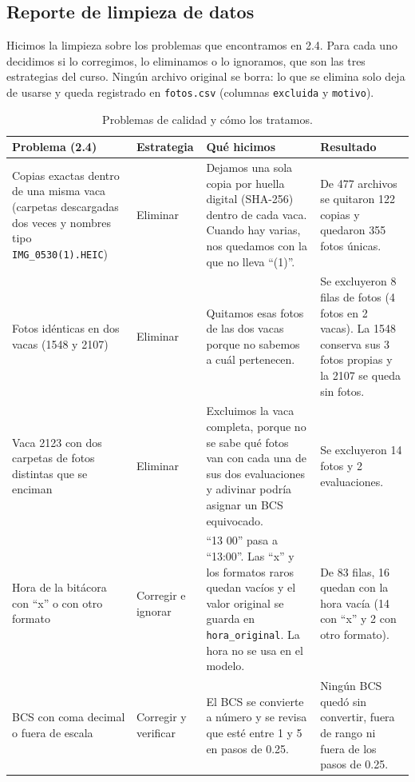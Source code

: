 \subsection{Reporte de limpieza de datos}

Hicimos la limpieza sobre los problemas que encontramos en 2.4. Para cada uno decidimos si lo corregimos, lo eliminamos o lo ignoramos, que son las tres estrategias del curso. Ningún archivo original se borra: lo que se elimina solo deja de usarse y queda registrado en \nolinkurl{fotos.csv} (columnas \texttt{excluida} y \texttt{motivo}).

\begin{table}[H]
  \centering
  \small
  \caption{Problemas de calidad y cómo los tratamos.}
  \label{tab:limpieza}
  \begin{tabularx}{\textwidth}{>{\raggedright\arraybackslash}p{}>{\raggedright\arraybackslash}p{}>{\raggedright\arraybackslash}X>{\raggedright\arraybackslash}p{}}
    \toprule
    Problema (2.4) & Estrategia & Qué hicimos & Resultado \\
    \midrule
    Copias exactas dentro de una misma vaca (carpetas descargadas dos veces y nombres tipo \nolinkurl{IMG_0530(1).HEIC}) & Eliminar & Dejamos una sola copia por huella digital (SHA-256) dentro de cada vaca. Cuando hay varias, nos quedamos con la que no lleva ``(1)''. & De 477 archivos se quitaron 122 copias y quedaron 355 fotos únicas. \\
    \addlinespace
    Fotos idénticas en dos vacas (1548 y 2107) & Eliminar & Quitamos esas fotos de las dos vacas porque no sabemos a cuál pertenecen. & Se excluyeron 8 filas de fotos (4 fotos en 2 vacas). La 1548 conserva sus 3 fotos propias y la 2107 se queda sin fotos. \\
    \addlinespace
    Vaca 2123 con dos carpetas de fotos distintas que se enciman & Eliminar & Excluimos la vaca completa, porque no se sabe qué fotos van con cada una de sus dos evaluaciones y adivinar podría asignar un BCS equivocado. & Se excluyeron 14 fotos y 2 evaluaciones. \\
    \addlinespace
    Hora de la bitácora con ``x'' o con otro formato & Corregir e ignorar & ``13 00'' pasa a ``13:00''. Las ``x'' y los formatos raros quedan vacíos y el valor original se guarda en \texttt{hora\_original}. La hora no se usa en el modelo. & De 83 filas, 16 quedan con la hora vacía (14 con ``x'' y 2 con otro formato). \\
    \addlinespace
    BCS con coma decimal o fuera de escala & Corregir y verificar & El BCS se convierte a número y se revisa que esté entre 1 y 5 en pasos de 0.25. & Ningún BCS quedó sin convertir, fuera de rango ni fuera de los pasos de 0.25. \\

\end{tabularx}
\end{table}
